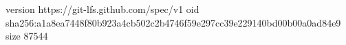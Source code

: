 version https://git-lfs.github.com/spec/v1
oid sha256:a1a8ea7448f80b923a4cb502c2b4746f59e297cc39e229140bd00b00a0ad84e9
size 87544
